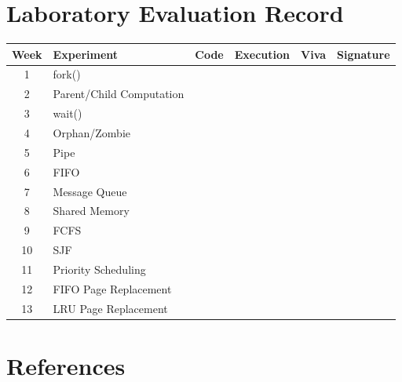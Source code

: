 \documentclass[12pt,a4paper]{report}
\begin{document}
\chapter*{Laboratory Evaluation Record}

\begin{longtable}{|c|p{6cm}|c|c|c|c|}
\hline

\textbf{Week} &
\textbf{Experiment} &
\textbf{Code} &
\textbf{Execution} &
\textbf{Viva} &
\textbf{Signature}
\\
\hline

1 & fork() & & & & \\[0.7cm]\hline
2 & Parent/Child Computation & & & & \\[0.7cm]\hline
3 & wait() & & & & \\[0.7cm]\hline
4 & Orphan/Zombie & & & & \\[0.7cm]\hline
5 & Pipe & & & & \\[0.7cm]\hline
6 & FIFO & & & & \\[0.7cm]\hline
7 & Message Queue & & & & \\[0.7cm]\hline
8 & Shared Memory & & & & \\[0.7cm]\hline
9 & FCFS & & & & \\[0.7cm]\hline
10 & SJF & & & & \\[0.7cm]\hline
11 & Priority Scheduling & & & & \\[0.7cm]\hline
12 & FIFO Page Replacement & & & & \\[0.7cm]\hline
13 & LRU Page Replacement & & & & \\[0.7cm]\hline

\end{longtable}


\chapter*{References}
\end{document}
